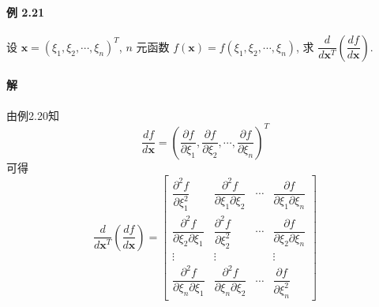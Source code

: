 \paragraph*{例 2.21} 设 $\bm{x} = (\xi_1, \xi_2, \cdots, \xi_n)^T$, $n$ 元函数 $f(\bm{x}) = f(\xi_1, \xi_2, \cdots, \xi_n)$, 求 $\dfrac{d}{d\bm{x}^T}(\dfrac{df}{d\bm{x}})$.

\paragraph*{解} 由例2.20知
$$
\dfrac{df}{d\bm{x}} = (\dfrac{\partial f}{\partial \xi_1}, \dfrac{\partial f}{\partial \xi_2}, \cdots, \dfrac{\partial f}{\partial \xi_n})^T
$$
可得
$$
    \dfrac{d}{d\bm{x}^T}(\dfrac{df}{d\bm{x}}) = \begin{bmatrix}
        \dfrac{\partial^2 f}{\partial \xi_1^2}            & \dfrac{\partial^2 f}{\partial \xi_1\partial\xi_2} & \cdots & \dfrac{\partial f}{\partial \xi_1\partial\xi_n} \\
        \dfrac{\partial^2 f}{\partial \xi_2\partial\xi_1} & \dfrac{\partial^2 f}{\partial \xi_2^2}            & \cdots & \dfrac{\partial f}{\partial \xi_2\partial\xi_n} \\
        \vdots                                            & \vdots                                            &        & \vdots                                          \\
        \dfrac{\partial^2 f}{\partial \xi_n\partial\xi_1} & \dfrac{\partial^2 f}{\partial \xi_n\partial\xi_2} & \cdots & \dfrac{\partial f}{\partial \xi_n^2}
    \end{bmatrix}
$$